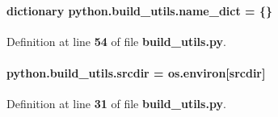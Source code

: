 \paragraph[{name\+\_\+dict}]{\setlength{\rightskip}{0pt plus 5cm}dictionary python.\+build\+\_\+utils.\+name\+\_\+dict = \{\}}\label{namespacepython_1_1build__utils_a8af7572950d8fae679b6086507a1ddf5}


Definition at line {\bf 54} of file {\bf build\+\_\+utils.\+py}.

\paragraph[{srcdir}]{ python.\+build\+\_\+utils.\+srcdir = os.\+environ[\textquotesingle{}srcdir\textquotesingle{}]}\label{namespacepython_1_1build__utils_a23f8177db4997ad3820705ce9a663260}


Definition at line {\bf 31} of file {\bf build\+\_\+utils.\+py}.

